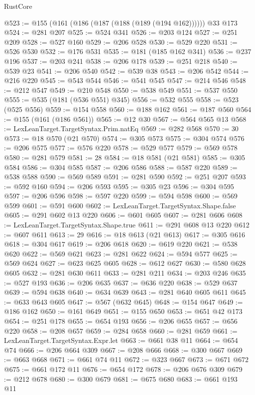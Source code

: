 \begin{lexlean}{RustCore}
\begin{coremodule}
@523 := @155 (@161 (@186 (@187 (@188 (@189 (@194 @162)))))) @33 @173
@524 := @281 @207
@525 := @524 @341
@526 := @203 @124
@527 := @251 @209
@528 := @527 @160
@529 := @206 @528
@530 := @529 @220
@531 := @526 @530
@532 := @176 @531
@535 := @181 (@185 @162 @341)
@536 := @237 @196
@537 := @203 @241
@538 := @206 @178
@539 := @251 @218
@540 := @539 @23
@541 := @206 @540
@542 := @539 @38
@543 := @206 @542
@544 := @216 @220
@545 := @543 @544
@546 := @541 @545
@547 := @214 @546
@548 := @212 @547
@549 := @210 @548
@550 := @538 @549
@551 := @537 @550
@555 := @535 (@181 (@536 @551) @345)
@556 := @532 @555
@558 := @523 (@525 @556)
@559 := @154 @558
@560 := @188 @162
@561 := @187 @560
@564 := @155 (@161 (@186 @561))
@565 := @12 @30
@567 := @564 @565 @13
@568 := LexLeanTarget.TargetSyntax.Prim.natEq
@569 := @282 @568
@570 := 30
@573 := @18 @570 (@21 @570)
@574 := @305 @573
@575 := @304 @574
@576 := @206 @575
@577 := @576 @220
@578 := @529 @577
@579 := @569 @578
@580 := @281 @579
@581 := 28
@584 := @18 @581 (@21 @581)
@585 := @305 @584
@586 := @304 @585
@587 := @206 @586
@588 := @587 @220
@589 := @538 @588
@590 := @569 @589
@591 := @281 @590
@592 := @251 @207
@593 := @592 @160
@594 := @206 @593
@595 := @305 @23
@596 := @304 @595
@597 := @206 @596
@598 := @597 @220
@599 := @594 @598
@600 := @569 @599
@601 := @591 @600
@602 := LexLeanTarget.TargetSyntax.Shape.false
@605 := @291 @602 @13 @220
@606 := @601 @605
@607 := @281 @606
@608 := LexLeanTarget.TargetSyntax.Shape.true
@611 := @291 @608 @13 @220
@612 := @607 @611
@613 := 29
@616 := @18 @613 (@21 @613)
@617 := @305 @616
@618 := @304 @617
@619 := @206 @618
@620 := @619 @220
@621 := @538 @620
@622 := @569 @621
@623 := @281 @622
@624 := @594 @577
@625 := @569 @624
@627 := @623 @625 @605
@628 := @612 @627
@630 := @580 @628 @605
@632 := @281 @630 @611
@633 := @281 @211
@634 := @203 @246
@635 := @527 @193
@636 := @206 @635
@637 := @636 @220
@638 := @529 @637
@639 := @594 @638
@640 := @634 @639
@643 := @281 @640 @605 @611
@645 := @633 @643 @605
@647 := @567 (@632 @645)
@648 := @154 @647
@649 := @186 @162
@650 := @161 @649
@651 := @155 @650
@653 := @651 @42 @173
@654 := @251 @178
@655 := @654 @193
@656 := @206 @655
@657 := @656 @220
@658 := @208 @657
@659 := @284 @658
@660 := @281 @659
@661 := LexLeanTarget.TargetSyntax.Expr.let
@663 := @661 @38 @11
@664 := @654 @74
@666 := @206 @664 @309
@667 := @208 @666
@668 := @300 @667
@669 := @663 @668
@671 := @661 @74 @11
@672 := @323 @667
@673 := @671 @672
@675 := @661 @172 @11
@676 := @654 @172
@678 := @206 @676 @309
@679 := @212 @678
@680 := @300 @679
@681 := @675 @680
@683 := @661 @193 @11

\end{coremodule}
\end{lexlean}
